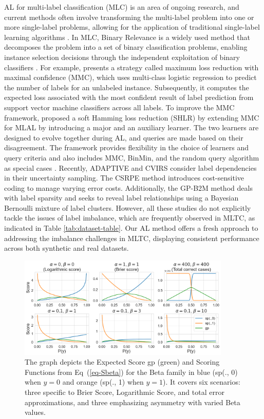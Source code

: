 \documentclass[letterpaper]{article} %
\begin{document}
AL for multi-label classification (MLC) is an area of ongoing research, and current methods often involve transforming the multi-label problem into one or more single-label problems, allowing for the application of traditional single-label learning algorithms \cite{Cherman2019, REYES2018494}. In MLC, Binary Relevance is a widely used method that decomposes the problem into a set of binary classification problems, enabling instance selection decisions through the independent exploitation of binary classifiers \cite{pmlr-v97-shi19b}.
For example, \citet{mmc2009} presents a strategy called maximum loss reduction with maximal confidence (MMC), which uses multi-class logistic regression to predict the number of labels for an unlabeled instance. Subsequently, it computes the expected
loss associated with the most
confident result of label prediction from support vector machine classifiers across all labels.
To improve the MMC framework, \citet{pmlr-v20-hung11} proposed a soft Hamming loss reduction (SHLR) by extending MMC for MLAL by introducing a major and an auxiliary learner. The two learners are designed to evolve together during AL, and queries are made based on their disagreement. The framework provides flexibility in the choice of learners and query criteria and also includes MMC, BinMin, and the random query algorithm as special cases \cite{10.1007/978-3-319-97304-3_73, REYES2018494}.
Recently, ADAPTIVE \cite{adaptive2013} and CVIRS \cite{REYES2018494}  consider
label dependencies in their uncertainty sampling.
The CSRPE \cite{10.1007/978-3-319-93034-3_12} method introduces cost-sensitive coding to manage varying error costs. Additionally, the GP-B2M \cite{gaupb2_2021} method deals with label sparsity and seeks to reveal label relationships using a Bayesian Bernoulli mixture of label clusters.
However, all these studies do not explicitly tackle the issues of label imbalance, which are frequently observed in MLTC, as indicated in Table \ref{tab:dataset-table}.
Our AL method offers a fresh approach to addressing the imbalance challenges in MLTC, displaying consistent performance across both synthetic and real datasets.

\begin{figure}[!t]
\centering
\includegraphics[width=0.9\textwidth]{figures/betagp_blt.png}
\caption{
The graph depicts the Expected Score gp (green) and Scoring Functions from Eq~(\ref{eq-Sbeta}) for the Beta family in blue (sp(., 0) when $y=0$ and orange (sp(., 1) when $y=1$). It covers six scenarios: three specific to Brier Score, Logarithmic Score, and total error approximations, and three emphasizing asymmetry with varied Beta values.
}
\label{fig:betagp_blt}
\end{figure}
\end{document}
